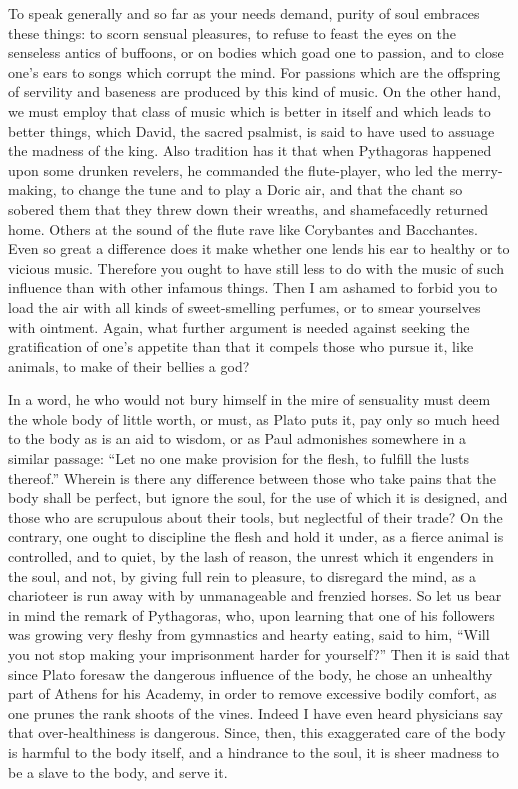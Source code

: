 \documentclass[a4paper]{article}
\begin{document}
To speak generally and so far as your needs demand, purity of soul embraces these things: to scorn sensual pleasures, to refuse to feast the eyes on the senseless antics of buffoons, or on bodies which goad one to passion, and to close one's ears to songs which corrupt the mind. For passions which are the offspring of servility and baseness are produced by this kind of music. On the other hand, we must employ that class of music which is better in itself and which leads to better things, which David, the sacred psalmist, is said to have used to assuage the madness of the king. Also tradition has it that when Pythagoras happened upon some drunken revelers, he commanded the flute-player, who led the merry-making, to change the tune and to play a Doric air, and that the chant so sobered them that they threw down their wreaths, and shamefacedly returned home. Others at the sound of the flute rave like Corybantes and Bacchantes. Even so great a difference does it make whether one lends his ear to healthy or to vicious music. Therefore you ought to have still less to do with the music of such influence than with other infamous things. Then I am ashamed to forbid you to load the air with all kinds of sweet-smelling perfumes, or to smear yourselves with ointment. Again, what further argument is needed against seeking the gratification of one's appetite than that it compels those who pursue it, like animals, to make of their bellies a god? 

In a word, he who would not bury himself in the mire of sensuality must deem the whole body of little worth, or must, as Plato puts it, pay only so much heed to the body as is an aid to wisdom, or as Paul admonishes somewhere in a similar passage: ``Let no one make provision for the flesh, to fulfill the lusts thereof.'' Wherein is there any difference between those who take pains that the body shall be perfect, but ignore the soul, for the use of which it is designed, and those who are scrupulous about their tools, but neglectful of their trade? On the contrary, one ought to discipline the flesh and hold it under, as a fierce animal is controlled, and to quiet, by the lash of reason, the unrest which it engenders in the soul, and not, by giving full rein to pleasure, to disregard the mind, as a charioteer is run away with by unmanageable and frenzied horses. So let us bear in mind the remark of Pythagoras, who, upon learning that one of his followers was growing very fleshy from gymnastics and hearty eating, said to him, ``Will you not stop making your imprisonment harder for yourself?'' Then it is said that since Plato foresaw the dangerous influence of the body, he chose an unhealthy part of Athens for his Academy, in order to remove excessive bodily comfort, as one prunes the rank shoots of the vines. Indeed I have even heard physicians say that over-healthiness is dangerous. Since, then, this exaggerated care of the body is harmful to the body itself, and a hindrance to the soul, it is sheer madness to be a slave to the body, and serve it. 
\end{document}
